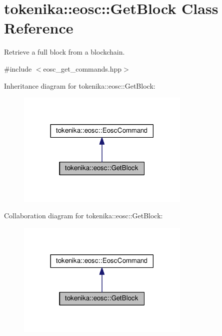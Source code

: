 \hypertarget{classtokenika_1_1eosc_1_1_get_block}{}\section{tokenika\+:\+:eosc\+:\+:Get\+Block Class Reference}
\label{classtokenika_1_1eosc_1_1_get_block}


Retrieve a full block from a blockchain.  




{\ttfamily \#include $<$eosc\+\_\+get\+\_\+commands.\+hpp$>$}



Inheritance diagram for tokenika\+:\+:eosc\+:\+:Get\+Block\+:\nopagebreak
\begin{figure}[H]
\begin{center}
\leavevmode
\includegraphics[width=234pt]{classtokenika_1_1eosc_1_1_get_block__inherit__graph}
\end{center}
\end{figure}


Collaboration diagram for tokenika\+:\+:eosc\+:\+:Get\+Block\+:\nopagebreak
\begin{figure}[H]
\begin{center}
\leavevmode
\includegraphics[width=234pt]{classtokenika_1_1eosc_1_1_get_block__coll__graph}
\end{center}
\end{figure}
